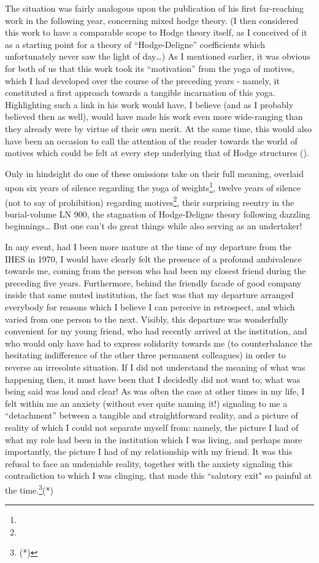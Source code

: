 The situation was fairly analogous upon the publication of his first far-reaching work in
the following year, concerning mixed hodge theory. 
(I then considered this work to have a comparable scope to Hodge theory itself, as I
conceived of it as a starting point for a theory of ``Hodge-Deligne'' coefficients which
unfortunately never saw the light of day\ldots)
As I mentioned earlier, it was obvious for both of us that this work took its
``motivation'' from the yoga of motives, which I had developed over the course of the
preceding years - namely, it constituted a first approach towards a tangible incarnation
of this yoga. Highlighting such a link in his work would have, I believe (and as I probably 
believed then as well), would have made his work even more wide-ranging than they already
were by virtue of their own merit. 
At the same time, this would also have been an occasion to call the attention of the
reader towards the world of motives which could be felt at every step 
underlying that of Hodge structures ().

Only in hindsight do one of these omissions take on their full meaning, overlaid upon six
years of silence regarding the yoga of weights\footnote{}, twelve years of silence (not to
say of prohibition) regarding motives\footnote{}, their surprising reentry in the burial-volume LN
900, the stagnation of Hodge-Deligne theory following dazzling beginnings\ldots
But one can't do great things while also serving as an undertaker!

In any event, had I been more mature at the time of my departure from the IHES in 1970, I
would have clearly felt the presence of a profound ambivalence towards me, coming from
the person who had been my closest friend during the preceding five years.
Furthermore, behind the friendly facade of good company inside that same muted
institution, the fact was that my departure arranged everybody for reasons which I believe
I can perceive in retrospect, and which varied from one person to the next. 
Visibly, this departure was wonderfully convenient for my young friend, who had recently
arrived at the institution, and who would only have had to express solidarity towards me
(to counterbalance the hesitating indifference of the other three permanent colleagues)
in order to reverse an irresolute situation. 
If I did not understand the meaning of what was happening then, it must have been that I
decidedly did not want to; what was being said was loud and clear!
As was often the case at other times in my life, I felt within me an anxiety (without
ever quite naming it!) signaling to me 
a ``detachment'' between a tangible and straightforward reality, 
and a picture of reality of which I could not separate myself from: namely, the picture I
had of what my role had been in the institution which I was living, and perhaps more
importantly, the picture I had of my relationship with my friend. 
It was this refusal to face an undeniable reality, together with the anxiety signaling
this contradiction to which I was clinging, that made this ``salutory exit"
so painful at the time.\footnote{(*)}(*)

